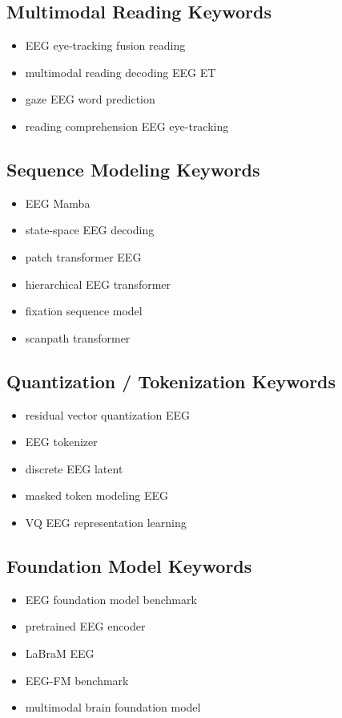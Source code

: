 \documentclass[11pt]{article}
\begin{document}
\subsection{Multimodal Reading Keywords}

\begin{itemize}
    \item EEG eye-tracking fusion reading
    \item multimodal reading decoding EEG ET
    \item gaze EEG word prediction
    \item reading comprehension EEG eye-tracking
\end{itemize}

\subsection{Sequence Modeling Keywords}

\begin{itemize}
    \item EEG Mamba
    \item state-space EEG decoding
    \item patch transformer EEG
    \item hierarchical EEG transformer
    \item fixation sequence model
    \item scanpath transformer
\end{itemize}

\subsection{Quantization / Tokenization Keywords}

\begin{itemize}
    \item residual vector quantization EEG
    \item EEG tokenizer
    \item discrete EEG latent
    \item masked token modeling EEG
    \item VQ EEG representation learning
\end{itemize}

\subsection{Foundation Model Keywords}

\begin{itemize}
    \item EEG foundation model benchmark
    \item pretrained EEG encoder
    \item LaBraM EEG
    \item EEG-FM benchmark
    \item multimodal brain foundation model
\end{itemize}
\end{document}
